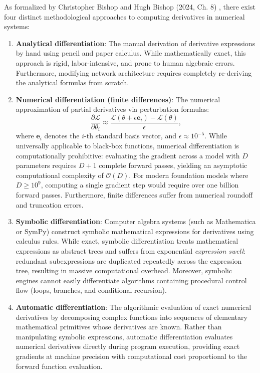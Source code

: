 \documentclass[../../../main.tex]{subfiles}
\begin{document}
As formalized by Christopher Bishop and Hugh Bishop (2024, Ch. 8) \citep{bishop2024deep}, there exist four distinct methodological approaches to computing derivatives in numerical systems:
\begin{enumerate}[label=(\roman*)]
    \item \textbf{Analytical differentiation}: The manual derivation of derivative expressions by hand using pencil and paper calculus. While mathematically exact, this approach is rigid, labor-intensive, and prone to human algebraic errors. Furthermore, modifying network architecture requires completely re-deriving the analytical formulas from scratch.
    \item \textbf{Numerical differentiation (finite differences)}: The numerical approximation of partial derivatives via perturbation formulas:
    \begin{equation}
    \frac{\partial \mathcal{L}}{\partial \theta_i} \approx \frac{\mathcal{L}(\theta + \epsilon \mathbf{e}_i) - \mathcal{L}(\theta)}{\epsilon},
    \end{equation}
    where $\mathbf{e}_i$ denotes the $i$-th standard basis vector, and $\epsilon \approx 10^{-5}$. While universally applicable to black-box functions, numerical differentiation is computationally prohibitive: evaluating the gradient across a model with $D$ parameters requires $D + 1$ complete forward passes, yielding an asymptotic computational complexity of $\mathcal{O}(D)$. For modern foundation models where $D \ge 10^9$, computing a single gradient step would require over one billion forward passes. Furthermore, finite differences suffer from numerical roundoff and truncation errors.
    \item \textbf{Symbolic differentiation}: Computer algebra systems (such as Mathematica or SymPy) construct symbolic mathematical expressions for derivatives using calculus rules. While exact, symbolic differentiation treats mathematical expressions as abstract trees and suffers from exponential \textit{expression swell}: redundant subexpressions are duplicated repeatedly across the expression tree, resulting in massive computational overhead. Moreover, symbolic engines cannot easily differentiate algorithms containing procedural control flow (loops, branches, and conditional recursion).
    \item \textbf{Automatic differentiation}: The algorithmic evaluation of exact numerical derivatives by decomposing complex functions into sequences of elementary mathematical primitives whose derivatives are known. Rather than manipulating symbolic expressions, automatic differentiation evaluates numerical derivatives directly during program execution, providing exact gradients at machine precision with computational cost proportional to the forward function evaluation.
\end{enumerate}
\end{document}

